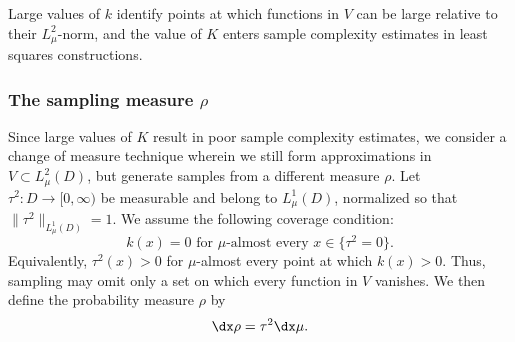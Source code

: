 \documentclass[10pt,dvipsnames]{amsart}
\begin{document}
Large values of \(k\) identify points at which functions in \(V\) can be large
relative to their \(L^2_\mu\)-norm, and the value of \(K\) enters sample
complexity estimates in least squares constructions.  

\subsubsection{The sampling measure $\rho$}\label{ssec:notation-sampling}
Since large values of \(K\) result in poor sample complexity estimates, we consider a change of measure technique wherein we still form approximations in $V \subset L^2_\mu(D)$, but generate samples from a different measure $\rho$. Let
\(\tau^2:D\to[0,\infty)\) be measurable and belong to $L^1_\mu(D)$, normalized so that
\(\|\tau^2\|_{L^1_\mu(D)} = 1\). We assume the following coverage condition:
\begin{equation}
\label{eq:sampling-coverage}
    k(x)=0
    \text{  for \(\mu\)-almost every  } x\in\{\tau^2=0\}.
\end{equation}
Equivalently, \(\tau^2(x)>0\) for \(\mu\)-almost every point at which
\(k(x)>0\). Thus, sampling may omit only a set on which every function in
\(V\) vanishes. We then define the probability measure $\rho$ by
\begin{equation}\label{eq:tau-def}
    \dx \rho=\tau^2 \dx \mu.
\end{equation}
\end{document}
